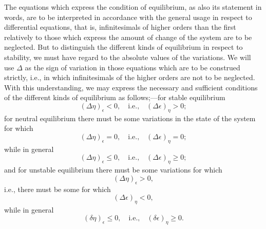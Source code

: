 \documentclass[11pt]{article}
\newcommand{\eps}{\epsilon}
\newcommand{\D}{\Delta}
\begin{document}
The equations which express the condition of equilibrium, as also its statement in words, are to be interpreted in accordance with the general usage in respect to differential equations, that is, infinitesimals of higher orders than the first relatively to those which express the amount of change of the system are to be neglected. But to distinguish the different kinds of equilibrium in respect to stability, we must have regard to the absolute values of the variations. We will use \(\D\) as the sign of variation in those equations which are to be construed strictly, i.e., in which infinitesimals of the higher orders are not to be neglected. With this understanding, we may express the necessary and sufficient conditions of the different kinds of equilibrium as follows;—for stable equilibrium
\begin{equation}
(\D\eta)_{\eps}<0,\quad \text{i.e.,}\quad (\D\eps)_{\eta}>0;
\end{equation}
for neutral equilibrium there must be some variations in the state of the system for which
\begin{equation}
(\D\eta)_{\eps}=0,\quad \text{i.e.,}\quad (\D\eps)_{\eta}=0;
\end{equation}
while in general
\begin{equation}
(\D\eta)_{\eps}\leq 0,\quad \text{i.e.,}\quad (\D\eps)_{\eta}\geq 0;
\end{equation}
and for unstable equilibrium there must be some variations for which
\begin{equation}
(\D\eta)_{\eps}>0,
\end{equation}
i.e., there must be some for which
\begin{equation}
(\D\eps)_{\eta}<0,
\end{equation}
while in general
\begin{equation}
(\delta\eta)_{\eps}\leq 0,\quad \text{i.e.,}\quad (\delta\eps)_{\eta}\geq 0.
\end{equation}
\end{document}
